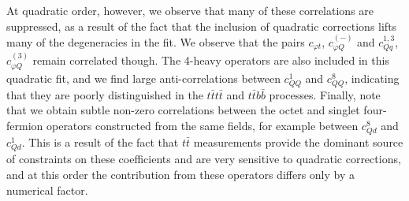 \documentclass[withindex,glossary]{cam-thesis}
\begin{document}
At quadratic order, however, we observe that many of these correlations are suppressed,
as a result of the fact that the inclusion of quadratic corrections lifts many of the 
degeneracies in the fit.
We observe that the pairs $c_{\varphi t}$, $c_{\varphi Q}^{(-)}$
and $c_{Qq}^{1,3}$, $c_{\varphi Q}^{(3)}$ remain correlated though.
The 4-heavy operators are also included in this quadratic fit, and we find large anti-correlations between 
$c_{QQ}^{1}$ and $c_{QQ}^8$, indicating that they are poorly distinguished in the $t \bar{t} t \bar{t}$
and $t \bar{t} b \bar{b}$ processes.  Finally, note that we obtain subtle non-zero correlations
between the octet and singlet four-fermion operators constructed from the same fields, for example between $c_{Qd}^8$ and $c_{Qd}^1$.
This is a result of the fact that $t \bar{t}$ measurements provide the dominant source of constraints on these coefficients and are
very sensitive to
quadratic corrections, and at this order the contribution from these operators differs only by
a numerical factor.
\end{document}
